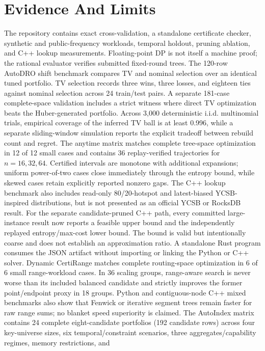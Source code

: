 \documentclass[10pt]{article}
\begin{document}
\section{Evidence And Limits}
The repository contains exact cross-validation, a standalone certificate
checker, synthetic and public-frequency workloads, temporal holdout, pruning
ablation, and C++ lookup measurements. Floating-point DP is not itself a
machine proof; the rational evaluator verifies submitted fixed-round trees.
The 120-row AutoDRO shift benchmark compares TV and nominal selection over an
identical tuned portfolio. TV selection records three wins, three losses, and
eighteen ties against nominal selection across 24 train/test pairs. A separate
181-case complete-space validation includes a strict witness where direct TV
optimization beats the Huber-generated portfolio. Across 3,000 deterministic
i.i.d. multinomial trials, empirical coverage of the inferred TV ball is at
least 0.996, while a separate sliding-window simulation reports the explicit
tradeoff between rebuild count and regret.
The anytime matrix matches complete tree-space optimization in 12 of 12 small
cases and contains 36 replay-verified trajectories for $n=16,32,64$.
Certified intervals are monotone with additional expansions; uniform
power-of-two cases close immediately through the entropy bound, while skewed
cases retain explicitly reported nonzero gaps. The C++ lookup benchmark also
includes read-only 80/20-hotspot and latest-biased YCSB-inspired
distributions, but is not presented as an official YCSB or RocksDB result.
For the separate candidate-pruned C++ path, every committed large-instance
result now reports a feasible upper bound and the independently replayed
entropy/max-cost lower bound. The bound is valid but intentionally coarse and
does not establish an approximation ratio. A standalone Rust program consumes
the JSON artifact without importing or linking the Python or C++ solver.
Dynamic CertiRange matches complete routing-space optimization in 6 of 6 small
range-workload cases. In 36 scaling groups, range-aware search is never worse
than its included balanced candidate and strictly improves the former
point/endpoint proxy in 18 groups. Python and contiguous-node C++ mixed
benchmarks also show that Fenwick or iterative segment trees remain faster for
raw range sums; no blanket speed superiority is claimed.
The AutoIndex matrix contains 24 complete eight-candidate portfolios (192
candidate rows) across four key-universe sizes, six temporal/constraint
scenarios, three aggregates/capability regimes, memory restrictions, and
\end{document}
